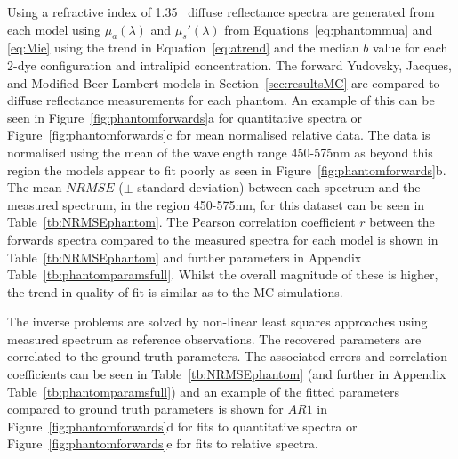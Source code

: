 Using a refractive index of 1.35~\citep{Pogue2006} diffuse reflectance spectra are generated from each model using $\mu_a(\lambda)$ and $\mu_s'(\lambda)$ from Equations~\eqref{eq:phantommua} and \eqref{eq:Mie} using the trend in Equation~\eqref{eq:atrend} and the median $b$ value for each 2-dye configuration and intralipid concentration. The forward Yudovsky, Jacques, and Modified Beer-Lambert models in Section~\ref{sec:resultsMC} are compared to diffuse reflectance measurements for each phantom.
An example of this can be seen in Figure~\ref{fig:phantomforwards}a for quantitative spectra or Figure~\ref{fig:phantomforwards}c for mean normalised relative data.
The data is normalised using the mean of the wavelength range 450-575nm as beyond this region the models appear to fit poorly as seen in Figure~\ref{fig:phantomforwards}b. 
The mean $NRMSE$ ($\pm$ standard deviation) between each spectrum and the measured spectrum, in the region 450-575nm, for this dataset can be seen in Table~\ref{tb:NRMSEphantom}. 
The Pearson correlation coefficient $r$ between the forwards spectra compared to the measured spectra for each model is shown in Table~\ref{tb:NRMSEphantom} and further parameters in Appendix Table~\ref{tb:phantomparamsfull}. Whilst the overall magnitude of these is higher, the trend in quality of fit is similar as to the MC simulations. 

The inverse problems are solved by non-linear least squares  approaches using measured spectrum as reference observations. The recovered parameters are correlated to the ground truth parameters. The associated errors and correlation coefficients can be seen in Table~\ref{tb:NRMSEphantom} (and further in Appendix Table~\ref{tb:phantomparamsfull}) and an example of the fitted parameters compared to ground truth parameters is shown for $AR1$ in Figure~\ref{fig:phantomforwards}d for fits to quantitative spectra or Figure~\ref{fig:phantomforwards}e for fits to 
relative spectra.

